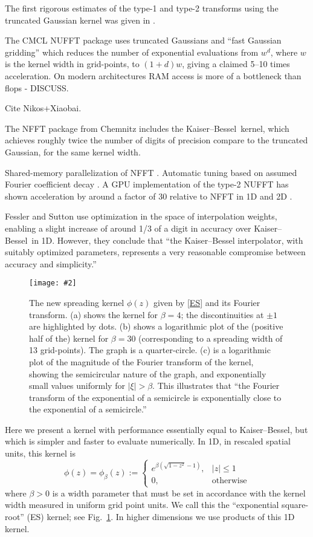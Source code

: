 \documentclass[10pt]{article}
\newcommand{\be}{\begin{equation}}
\newcommand{\ee}{\end{equation}}
\newcommand{\bfi}{\begin{figure}}
\newcommand{\efi}{\end{figure}}
\newcommand{\ca}[2]{\caption{#1 \label{#2}}}
\newcommand{\ig}[2]{\texttt{[image: \#2]}}
\newcommand{\KB}{Kaiser--Bessel}
\newcommand{\wid}{\beta}               %
\begin{document}
The first rigorous estimates of the type-1 and type-2 transforms
using the truncated Gaussian kernel was given in \cite{dutt}.

The CMCL NUFFT package \cite{cmcl} uses truncated Gaussians
and ``fast Gaussian gridding'' \cite[Sec.~3]{nufft}
which reduces the number of exponential evaluations
from $w^d$, where $w$ is the kernel width in grid-points,
to $(1+d)w$, giving a claimed 5--10 times acceleration.
On modern architectures RAM access is more of a bottleneck than
flops - DISCUSS.

Cite Nikos+Xiaobai.

The NFFT package \cite{nfft} from Chemnitz
includes the \KB\ kernel,
which
achieves roughly twice the number of digits of precision
compare to the truncated Gaussian, for the same kernel width.

Shared-memory parallelization of NFFT \cite{volkmer}.
Automatic tuning based on assumed Fourier coefficient decay \cite{nestler}.
A GPU implementation of the type-2 NUFFT has shown acceleration by around
a factor of 30 relative to NFFT in 1D and 2D \cite{cunfft}.

Fessler and Sutton \cite{fessler} use optimization in the space of
interpolation weights, enabling a slight increase of around 1/3 of a
digit in accuracy over \KB\ in 1D. However, they conclude that
``the
Kaiser--Bessel interpolator, with suitably optimized parameters,
represents a very reasonable compromise between accuracy and
simplicity.''



\bfi[t]  %
\ig{width=6.5in}{kernel.eps}
\ca{The new spreading kernel $\phi(z)$ given by
  \eqref{ES} and its Fourier transform.
  (a) shows the kernel for $\beta=4$; the discontinuities at
  $\pm 1$ are highlighted by dots.
  (b) shows a logarithmic plot of the (positive half of the)
  kernel for $\beta=30$
  (corresponding to a spreading width of 13 grid-points).
  The graph is a quarter-circle.
  (c) is a logarithmic plot of the magnitude of the
  Fourier transform of the kernel,
  showing the semicircular nature of the graph, and exponentially
  small values uniformly for $|\xi|>\beta$.
  This illustrates that ``the Fourier transform of the exponential
  of a semicircle is exponentially close to the exponential of a semicircle.''
}{f:kernel}
\efi
  

Here we present a kernel with performance essentially
equal to \KB, but which is simpler and faster to evaluate numerically.
In 1D, in rescaled spatial units, this kernel is
\be
\phi(z) = \phi_\beta(z) :=
\left\{\begin{array}{ll}
e^{\beta (\sqrt{1-z^2}-1)}, & |z|\le 1\\
0, & \mbox{otherwise}
\end{array}
\right.
\label{ES}
\ee
where $\wid>0$ is a width parameter that must be set
in accordance with the kernel width measured in uniform grid point units.
We call this the ``exponential square-root'' (ES) kernel;
see Fig.~\ref{f:kernel}.
In higher dimensions we use products of this 1D kernel.
\end{document}
